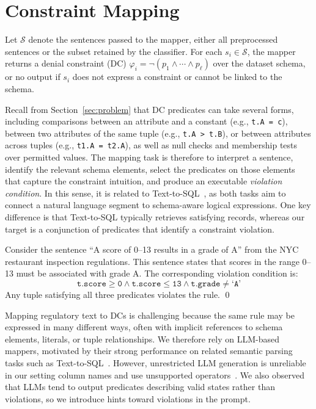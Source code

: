 \section{Constraint Mapping}
\label{sec:mapper}

Let $\mathcal{S}$ denote the sentences passed to the mapper, either all preprocessed sentences or the subset retained by the classifier. For each $s_i \in \mathcal{S}$, the mapper returns a denial constraint (DC) $\varphi_i = \neg(p_1 \land \cdots \land p_\ell)$ over the dataset schema, or no output if $s_i$ does not express a constraint or cannot be linked to the schema.

Recall from Section~\ref{sec:problem} that DC predicates can take several forms, including comparisons between an attribute and a constant (e.g., \texttt{t.A = c}), between two attributes of the same tuple (e.g., \texttt{t.A > t.B}), or between attributes across tuples (e.g., \texttt{t1.A = t2.A}), as well as null checks and membership tests over permitted values.
The mapping task is therefore to interpret a sentence, identify the relevant schema elements, select the predicates on those elements that capture the constraint intuition, and produce an executable \emph{violation condition}. In this sense, it is related to Text-to-SQL~\cite{yu2018spider}, as both tasks aim to connect a natural language segment to schema-aware logical expressions. One key difference is that Text-to-SQL typically retrieves satisfying records, whereas our target is a conjunction of predicates that identify a constraint violation.

\begin{example}
\label{ex:mapping}
Consider the sentence ``A score of 0--13 results in a grade of A'' from the NYC restaurant inspection regulations. This sentence states that scores in the range 0--13 must be associated with grade A. The corresponding violation condition is:
\[
\texttt{t.score} \geq \texttt{0} \land \texttt{t.score} \leq \texttt{13} \land \texttt{t.grade} \neq \texttt{`A'}
\]
Any tuple satisfying all three predicates violates the rule. \qed
\end{example}

Mapping regulatory text to DCs is challenging because the same rule may be expressed in many different ways, often with implicit references to schema elements, literals, or tuple relationships. 
We therefore rely on LLM-based mappers, motivated by their strong performance on related semantic parsing tasks such as Text-to-SQL~\cite{llmTEXT2SQLSurvey2025}. However, unrestricted LLM generation is unreliable in our setting column names and use unsupported operators~\cite{dail2025,llmTEXT2SQLSurvey2025,DBLP:conf/dexa/DociniAO25}. 
We also observed that LLMs tend to output predicates describing valid states rather than violations, so we introduce hints toward violations in the prompt.

